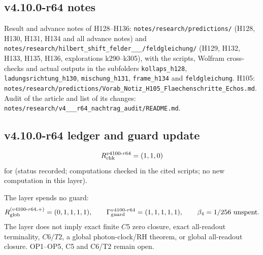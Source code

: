 \subsection*{v4.10.0-r64 notes}
\label{subsec:v4100-r64-notes}

{\raggedright
Result and advance notes of H128--H136: \texttt{notes/\allowbreak research/\allowbreak predictions/} (H128, H130, H131, H134 and all advance
notes) and \texttt{notes/\allowbreak research/\allowbreak hilbert\_\allowbreak shift\_\allowbreak felder\_\_\_/\allowbreak feldgleichung/}
(H129, H132, H133, H135, H136, explorations k290--k305), with the scripts, Wolfram cross-checks and actual outputs in the subfolders
\texttt{kollaps\_\allowbreak h128}, \texttt{ladungsrichtung\_\allowbreak h130}, \texttt{mischung\_\allowbreak h131}, \texttt{frame\_\allowbreak h134} and
\texttt{feldgleichung}.  H105: \texttt{notes/\allowbreak research/\allowbreak predictions/\allowbreak Vorab\_\allowbreak Notiz\_\allowbreak H105\_\allowbreak Flaechenschritte\_\allowbreak Echos.md}.
Audit of the article and list of its changes: \texttt{notes/\allowbreak research/\allowbreak v4\_\_\_\allowbreak r64\_\allowbreak nachtrag\_\allowbreak audit/\allowbreak README.md}.
\par}

\subsection*{v4.10.0-r64 ledger and guard update}
\label{subsec:v4100-r64-ledger-guard}

\[
R_{\rm chk}^{v4100\text{-}r64}=(1,1,0)
\]
for (status recorded; computations checked in the cited scripts; no new computation in this layer).

The layer spends no guard:
\[
R_{\rm glob}^{(v4100\text{-}r64,+)}=(0,1,1,1,1),
\qquad
\Gamma_{\rm guard}^{v4100\text{-}r64}=(1,1,1,1,1),
\qquad
\beta_4=1/256\ \text{unspent}.
\]
The layer does not imply exact finite \(C5\) zero closure, exact all-readout terminality, \(C6/T2\), a global photon-clock/RH theorem,
or global all-readout closure.  OP1--OP5, C5 and C6/T2 remain open.
